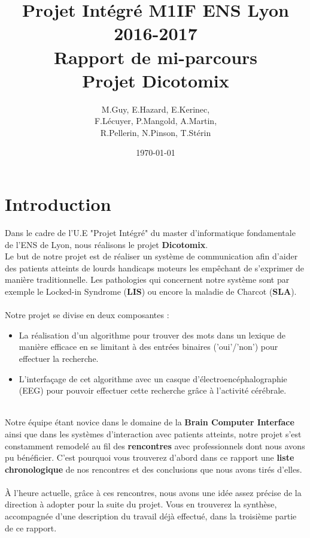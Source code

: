 \documentclass[12pt]{article}
\begin{document}
\title{Projet Intégré M1IF ENS Lyon 2016-2017 \\ Rapport de mi-parcours \\ Projet Dicotomix }
\author{M.Guy, E.Hazard, E.Kerinec,\\ F.Lécuyer, P.Mangold, A.Martin,\\ R.Pellerin, N.Pinson, T.Stérin}
\date{\today}

\maketitle
\tableofcontents
\newpage

\section{Introduction}

Dans le cadre de l'U.E "Projet Intégré" du master d'informatique fondamentale de l'ENS de Lyon, nous réalisons le projet \textbf{Dicotomix}. \\
Le but de notre projet est de réaliser un système de communication afin d'aider des patients atteints de lourds handicaps moteurs les empêchant de s'exprimer de manière traditionnelle. Les pathologies qui concernent notre système sont par exemple le Locked-in Syndrome (\textbf{LIS}) ou encore la maladie de Charcot (\textbf{SLA}). \\ \ \\
Notre projet se divise en deux composantes :
\begin{itemize}
\item La réalisation d'un algorithme pour trouver des mots dans un lexique de manière efficace en se limitant à des entrées binaires ('oui'/'non') pour effectuer la recherche.
\item L'interfaçage de cet algorithme avec un casque d'électroencéphalographie (EEG) pour pouvoir effectuer cette recherche grâce à l'activité cérébrale.
\end{itemize}
\ \\
\indent Notre équipe étant novice dans le domaine de la \textbf{Brain Computer Interface} ainsi que dans les systèmes d'interaction avec patients atteints, notre projet s'est constamment remodelé au fil des \textbf{rencontres} avec professionnels dont nous avons pu bénéficier. C'est pourquoi vous trouverez d'abord dans ce rapport une \textbf{liste chronologique} de nos rencontres et des conclusions que nous avons tirés d'elles.  \\ \ \\
\indent À l'heure actuelle, grâce à ces rencontres, nous avons une idée assez précise de la direction à adopter pour la suite du projet. Vous en trouverez la synthèse, accompagnée d'une description du travail déjà effectué, dans la troisième partie de ce rapport.
\newpage
\end{document}
